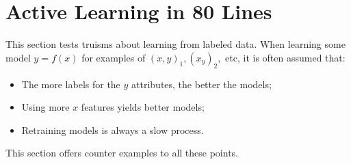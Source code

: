 \documentclass[AMA,STIX2COL]{WileyNJDv5}
\begin{document}
{\section{Active Learning in 80 Lines }\label{sec:active}

This section tests  truisms about learning
from labeled data. 
When learning some model $y=f(x)$ for examples of $(x,y)_1, (x_y)_2,$ etc,
it is often assumed that:
\begin{itemize}
\item
The  more labels for the $y$ attributes, the better the models;
\item 
Using 
more  $x$ features yields better models;
\item
Retraining models is always  a slow process.
\end{itemize}
This section offers counter examples to all these points.

}
\end{document}
